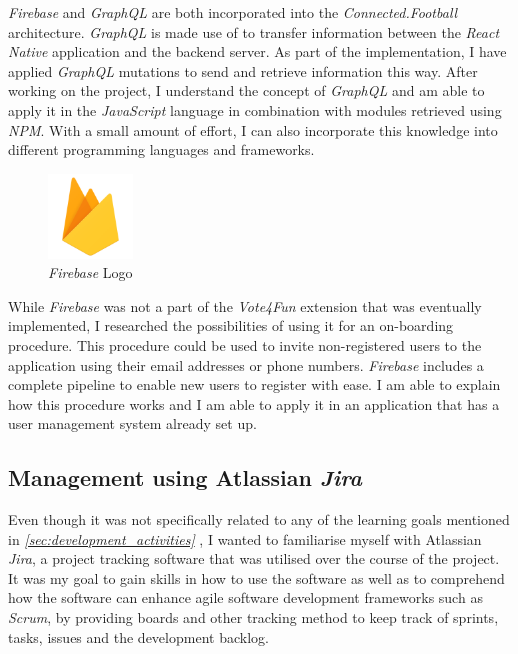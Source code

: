 \textit{Firebase} and \textit{GraphQL} are both incorporated into the \textit{Connected.Football} architecture. \textit{GraphQL} is made use of to transfer information between the \textit{React Native} application and the backend server. As part of the implementation, I have applied \textit{GraphQL} mutations to send and retrieve information this way. After working on the project, I understand the concept of \textit{GraphQL} and am able to apply it in the \textit{JavaScript} language in combination with modules retrieved using \textit{NPM}. With a small amount of effort, I can also incorporate this knowledge into different programming languages and frameworks.

\begin{figure}[H]
    \centering
    \includegraphics[width=0.2\textwidth]{images/firebase-logo.png}
    \caption{\textit{Firebase} Logo}
    \label{fig:firebase_logo}
\end{figure}

While \textit{Firebase} was not a part of the \textit{Vote4Fun} extension that was eventually implemented, I researched the possibilities of using it for an on-boarding procedure. This procedure could be used to invite non-registered users to the application using their email addresses or phone numbers. \textit{Firebase} includes a complete pipeline to enable new users to register with ease. I am able to explain how this procedure works and I am able to apply it in an application that has a user management system already set up.

\subsection{Management using Atlassian \textit{Jira}}
\label{ssec:jira}

Even though it was not specifically related to any of the learning goals mentioned in \textit{\ref{sec:development_activities} }, I wanted to familiarise myself with Atlassian \textit{Jira}, a project tracking software that was utilised over the course of the project. It was my goal to gain skills in how to use the software as well as to comprehend how the software can enhance agile software development frameworks such as \textit{Scrum}, by providing boards and other tracking method to keep track of sprints, tasks, issues and the development backlog.


